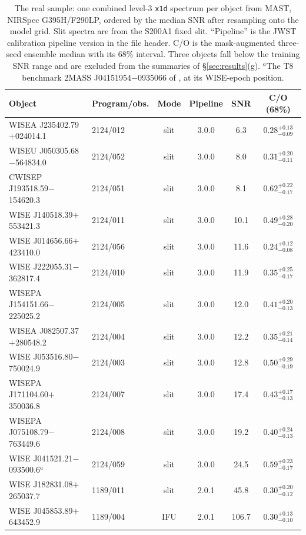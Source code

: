 \documentclass{article}
\begin{document}
\begin{table}[h]
\centering
\caption{The real sample: one combined level-3 \texttt{x1d} spectrum per object
from MAST, NIRSpec G395H/F290LP, ordered by the median SNR after resampling
onto the model grid. Slit spectra are from the S200A1 fixed slit. ``Pipeline''
is the JWST calibration pipeline version in the file header. C/O is the
mask-augmented three-seed ensemble median with its 68\% interval. Three objects
fall below the training SNR range and are excluded from the summaries of
\S\ref{sec:results}(g). $^{a}$The T8 benchmark 2MASS J04151954$-$0935066 of
\citet{hood2024}, at its WISE-epoch position.}
\label{tab:sample}
\small
\begin{tabular}{llcccc}
\toprule
Object & Program/obs. & Mode & Pipeline & SNR & C/O (68\%) \\
\midrule
WISEA J235402.79$+$024014.1 & 2124/012 & slit & 3.0.0 & 6.3 & $0.28_{-0.09}^{+0.13}$ \\
WISEU J050305.68$-$564834.0 & 2124/052 & slit & 3.0.0 & 8.0 & $0.31_{-0.11}^{+0.20}$ \\
CWISEP J193518.59$-$154620.3 & 2124/051 & slit & 3.0.0 & 8.1 & $0.62_{-0.17}^{+0.22}$ \\
WISE J140518.39$+$553421.3 & 2124/011 & slit & 3.0.0 & 10.1 & $0.49_{-0.20}^{+0.28}$ \\
WISE J014656.66$+$423410.0 & 2124/056 & slit & 3.0.0 & 11.6 & $0.24_{-0.08}^{+0.12}$ \\
WISE J222055.31$-$362817.4 & 2124/010 & slit & 3.0.0 & 11.9 & $0.35_{-0.17}^{+0.25}$ \\
WISEPA J154151.66$-$225025.2 & 2124/005 & slit & 3.0.0 & 12.0 & $0.41_{-0.13}^{+0.20}$ \\
WISEA J082507.37$+$280548.2 & 2124/004 & slit & 3.0.0 & 12.2 & $0.35_{-0.14}^{+0.21}$ \\
WISE J053516.80$-$750024.9 & 2124/003 & slit & 3.0.0 & 12.8 & $0.50_{-0.19}^{+0.29}$ \\
WISEPA J171104.60$+$350036.8 & 2124/007 & slit & 3.0.0 & 17.4 & $0.43_{-0.13}^{+0.17}$ \\
WISEPA J075108.79$-$763449.6 & 2124/008 & slit & 3.0.0 & 19.2 & $0.40_{-0.13}^{+0.24}$ \\
WISE J041521.21$-$093500.6$^{a}$ & 2124/059 & slit & 3.0.0 & 24.5 & $0.59_{-0.17}^{+0.23}$ \\
WISE J182831.08$+$265037.7 & 1189/011 & slit & 2.0.1 & 45.8 & $0.30_{-0.12}^{+0.20}$ \\
WISE J045853.89$+$643452.9 & 1189/004 & IFU & 2.0.1 & 106.7 & $0.30_{-0.10}^{+0.13}$ \\
\bottomrule
\end{tabular}
\end{table}
\end{document}
